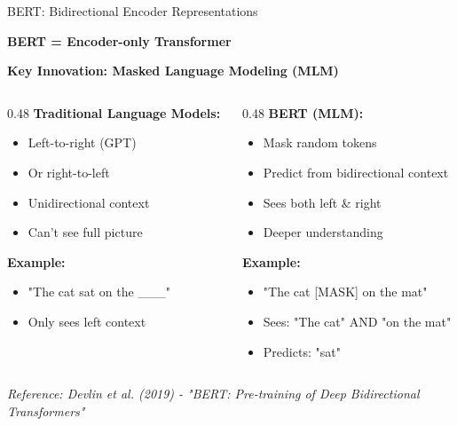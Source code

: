 \documentclass[aspectratio=169]{beamer}
\begin{document}
\begin{frame}[shrink=10]{BERT: Bidirectional Encoder Representations 🎯}
\begin{center}
\LARGE
\textbf{BERT = Encoder-only Transformer}
\end{center}

\vspace{1em}

\textbf{Key Innovation: Masked Language Modeling (MLM)}

\vspace{1em}

\begin{columns}[T]
\begin{column}{0.48\textwidth}
\textbf{Traditional Language Models:}
\begin{itemize}\setlength{\itemsep}{0pt}
    \item Left-to-right (GPT)
    \item Or right-to-left
    \item \alert{Unidirectional context}
    \item Can't see full picture
\end{itemize}

\vspace{1em}

\textbf{Example:}
\begin{itemize}\setlength{\itemsep}{0pt}
    \item "The cat sat on the \_\_\_"
    \item Only sees left context
\end{itemize}
\end{column}

\pause

\begin{column}{0.48\textwidth}
\textbf{BERT (MLM):}
\begin{itemize}\setlength{\itemsep}{0pt}
    \item Mask random tokens
    \item Predict from \alert{bidirectional context}
    \item Sees both left \& right
    \item Deeper understanding
\end{itemize}

\vspace{1em}

\textbf{Example:}
\begin{itemize}\setlength{\itemsep}{0pt}
    \item "The cat [MASK] on the mat"
    \item Sees: "The cat" AND "on the mat"
    \item Predicts: "sat"
\end{itemize}
\end{column}
\end{columns}

\vspace{1em}
\small
\textit{Reference: Devlin et al. (2019) - "BERT: Pre-training of Deep Bidirectional Transformers"}
\end{frame}
\end{document}
